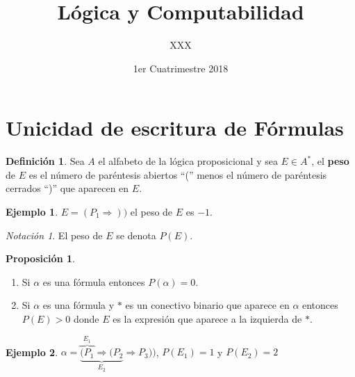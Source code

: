 \documentclass[a4paper,11pt]{article}
\title{Lógica y Computabilidad}
\author{XXX}
\date{1er Cuatrimestre 2018}
\theoremstyle{definition}
\newtheorem{defn}{Definición}[section]
\newtheorem{exap}{Ejemplo}[section]
\newtheorem{prop}{Proposición}[section]
\theoremstyle{remark}
\newtheorem*{notc}{Notación}
\begin{document}
\maketitle

\section{Unicidad de escritura de Fórmulas}

\begin{defn}
Sea $A$ el alfabeto de la lógica proposicional y sea $E \in A^*$, el \textbf{peso} de $E$ es
el número de paréntesis abiertos ``('' menos el número de paréntesis cerrados ``)'' 
que aparecen en $E$.
\end{defn}

\begin{exap}
$E = (P_1 \Rightarrow ))$ el peso de $E$ es $-1$.
\end{exap}

\begin{notc}
El peso de $E$ se denota $P(E)$.
\end{notc}


\begin{prop}
\begin{enumerate}
\item Si $\alpha$ es una fórmula entonces $P(\alpha) = 0$.
\item Si $\alpha$ es una fórmula y $*$ es un conectivo binario que aparece en $\alpha$
entonces $P(E) > 0$ donde $E$ es la expresión que aparece a la izquierda de $*$.
\end{enumerate}
\end{prop}

\begin{exap}
$\alpha = \underbrace{\overbrace{(P_1}^{E_1} \Rightarrow (P_2}_{E_2} \Rightarrow P_3))$,
$P(E_1) = 1$ y $P(E_2) = 2$
\end{exap}
\end{document}
